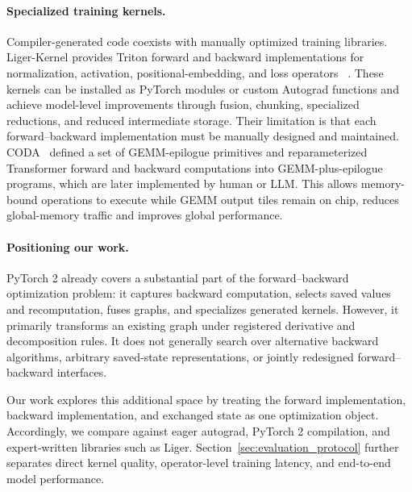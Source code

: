 \paragraph{Specialized training kernels.}
Compiler-generated code coexists with manually optimized training libraries.
Liger-Kernel provides Triton forward and backward implementations for
normalization, activation, positional-embedding, and loss operators
~\cite{hsu2024liger}. These kernels can be installed as PyTorch modules or
custom Autograd functions and achieve model-level improvements through fusion,
chunking, specialized reductions, and reduced intermediate storage. Their
limitation is that each forward--backward implementation must be manually
designed and maintained. CODA~\cite{guo2026coda} defined a set of GEMM-epilogue primitives and reparameterized Transformer forward and backward computations into GEMM-plus-epilogue programs, which are later implemented by human or LLM. This allows memory-bound operations to execute while GEMM output tiles remain on chip, reduces global-memory traffic and improves global performance.  

\paragraph{Positioning our work.}
PyTorch 2 already covers a substantial part of the forward--backward
optimization problem: it captures backward computation, selects saved values
and recomputation, fuses graphs, and specializes generated kernels. However,
it primarily transforms an existing graph under registered derivative and
decomposition rules. It does not generally search over alternative backward
algorithms, arbitrary saved-state representations, or jointly redesigned
forward--backward interfaces.


Our work explores this additional space by treating the forward implementation,
backward implementation, and exchanged state as one optimization object.
Accordingly, we compare against eager autograd, PyTorch 2 compilation, and
expert-written libraries such as Liger. Section~\ref{sec:evaluation_protocol}
further separates direct kernel quality, operator-level training latency, and
end-to-end model performance.
